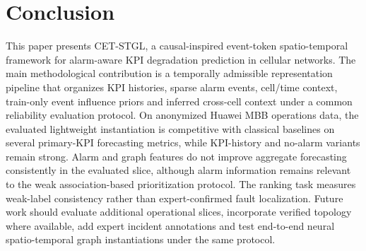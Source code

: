 \section{Conclusion}
\label{sec:conclusion}
This paper presents CET-STGL, a causal-inspired event-token spatio-temporal framework for alarm-aware KPI degradation prediction in cellular networks. The main methodological contribution is a temporally admissible representation pipeline that organizes KPI histories, sparse alarm events, cell/time context, train-only event influence priors and inferred cross-cell context under a common reliability evaluation protocol. On anonymized Huawei MBB operations data, the evaluated lightweight instantiation is competitive with classical baselines on several primary-KPI forecasting metrics, while KPI-history and no-alarm variants remain strong. Alarm and graph features do not improve aggregate forecasting consistently in the evaluated slice, although alarm information remains relevant to the weak association-based prioritization protocol. The ranking task measures weak-label consistency rather than expert-confirmed fault localization. Future work should evaluate additional operational slices, incorporate verified topology where available, add expert incident annotations and test end-to-end neural spatio-temporal graph instantiations under the same protocol.
